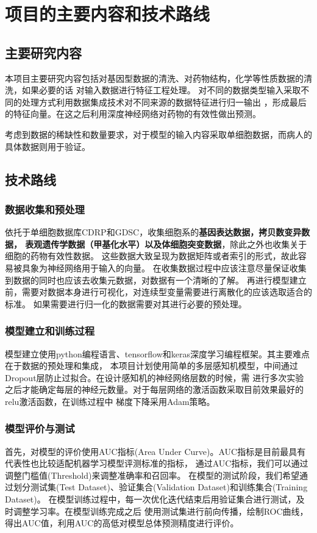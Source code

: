 \section{项目的主要内容和技术路线}

\subsection{主要研究内容}
本项目主要研究内容包括对基因型数据的清洗、对药物结构，化学等性质数据的清洗，如果必要的话
对输入数据进行特征工程处理。
对不同的数据类型输入采取不同的处理方式利用数据集成技术对不同来源的数据特征进行归一输出
，形成最后的特征向量。在这之后利用深度神经网络对药物的有效性做出预测。

考虑到数据的稀缺性和数量要求，对于模型的输入内容采取单细胞数据，而病人的具体数据则用于验证。


\subsection{技术路线}
\subsubsection{数据收集和预处理}
依托于单细胞数据库CDRP和GDSC，收集细胞系的\textbf{基因表达数据，拷贝数变异数据，
表观遗传学数据（甲基化水平）以及体细胞突变数据}，除此之外也收集关于细胞的药物有效性数据。
这些数据大致呈现为数据矩阵或者索引的形式，故此容易被具象为神经网络用于输入的向量。
在收集数据过程中应该注意尽量保证收集到数据的同时也应该去收集元数据，对数据有一个清晰的了解。
再进行模型建立前，需要对数据本身进行可视化，对连续型变量需要进行离散化的应该选取适合的标准。
如果需要进行归一化的数据需要对其进行必要的预处理。

\subsubsection{模型建立和训练过程}
模型建立使用python编程语言、tensorflow和keras深度学习编程框架。其主要难点在于数据的预处理和集成，
本项目计划使用简单的多层感知机模型，中间通过Dropout层防止过拟合。在设计感知机的神经网络层数的时候，需
进行多次实验之后才能确定每层的神经元数量。对于每层网络的激活函数采取目前效果最好的relu激活函数，在训练过程中
梯度下降采用Adam策略。

\subsubsection{模型评价与测试}
首先，对模型的评价使用AUC指标(Area Under Curve)。AUC指标是目前最具有代表性也比较适配机器学习模型评测标准的指标，
通过AUC指标，我们可以通过调整门槛值(Threshold)来调整准确率和召回率。
在模型的测试阶段，我们希望通过划分测试集(Test Dataset)、验证集合(Validation Dataset)和训练集合(Training Dataset)。
在模型训练过程中，每一次优化迭代结束后用验证集合进行测试，及时调整学习率。在模型训练完成之后
使用测试集进行前向传播，绘制ROC曲线，得出AUC值，利用AUC的高低对模型总体预测精度进行评价。


